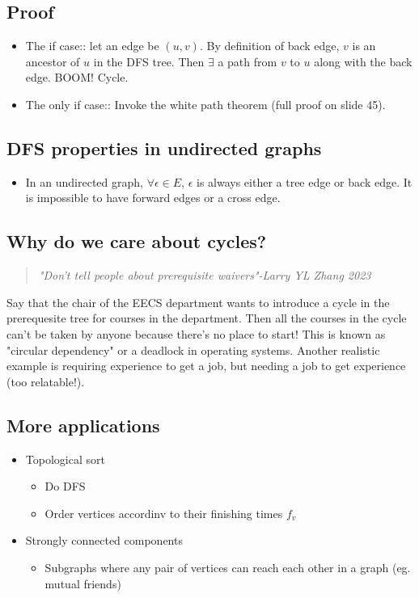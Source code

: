\documentclass[12pt]{book}
\begin{document}
\subsection*{Proof}

\begin{itemize}
    \item The if case:: let an edge be $(u,v)$. By definition of back edge, $v$ is an ancestor of $u$ in the DFS tree. Then $\exists$ a path from $v$ to $u$ along with the back edge. BOOM! Cycle.
    \item The only if case:: Invoke the white path theorem (full proof on slide 45).
\end{itemize}

\subsection*{DFS properties in undirected graphs}

\begin{itemize}
    \item In an undirected graph, $\forall \epsilon \in E$, $\epsilon$ is always either a tree edge or back edge. It is impossible to have forward edges or a cross edge.
\end{itemize}

\subsection*{Why do we care about cycles?}

\begin{quote}
    \textit{"Don't tell people about prerequisite waivers"-Larry YL Zhang 2023}
\end{quote}

Say that the chair of the EECS department wants to introduce a cycle in the prerequesite tree for courses in the department. Then all the courses in the cycle can't be taken by anyone because there's no place to start! This is known as "circular dependency" or a deadlock in operating systems. Another realistic example is requiring experience to get a job, but needing a job to get experience (too relatable!).

\subsection*{More applications}

\begin{itemize}
    \item Topological sort
    \begin{itemize}
        \item Do DFS
        \item Order vertices accordinv to their finishing times $f_v$
    \end{itemize}
    \item Strongly connected components
    \begin{itemize}
        \item Subgraphs where any pair of vertices can reach each other in a graph (eg. mutual friends)
    \end{itemize}
\end{itemize}
\end{document}
